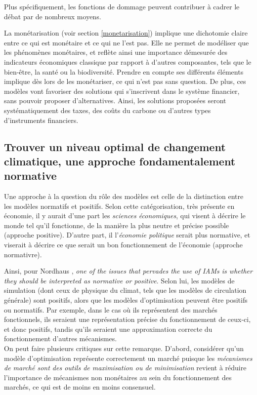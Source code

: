 Plus spécifiquement, les fonctions de dommage peuvent contribuer à cadrer le débat par de nombreux moyens. 

La monétarisation (voir section \ref{monetarisation}) implique une dichotomie claire entre ce qui est monétaire et ce qui ne l'est pas. Elle ne permet de modéliser que les phénomènes monétaires, et reflète ainsi une importance démesurée des indicateurs économiques classique par rapport à d'autres composantes, tels que le bien-être, la santé ou la biodiversité. Prendre en compte ses différents éléments implique dès lors de les monétariser, ce qui n'est pas sans question. 
De plus, ces modèles vont favoriser des solutions qui s'inscrivent dans le système financier, sans pouvoir proposer d'alternatives. Ainsi, les solutions proposées seront systématiquement des taxes, des coûts du carbone ou d'autres types d'instruments financiers.

\subsection{Trouver un niveau optimal de changement climatique, une approche fondamentalement normative}

Une approche à la question du rôle des modèles est celle de la distinction entre les modèles normatifs et positifs. Selon cette catégorisation, très présente en économie, il y aurait d'une part les \emph{sciences économiques}, qui visent à décrire le monde tel qu'il fonctionne, de la manière la plus neutre et précise possible (approche positive). D'autre part, il l'\emph{économie politique} serait plus normative, et viserait à décrire ce que serait un bon fonctionnement de l'économie (approche normativre). 

Ainsi, pour Nordhaus \cite{nordhaus_dice_2013}, \emph{one of the issues that pervades the use of IAMs is whether they should be interpreted as normative or positive}. Selon lui, les modèles de simulation (dont ceux de physique du climat, tels que les modèles de circulation générale) sont positifs, alors que les modèles d'optimisation peuvent être positifs ou normatifs. Par exemple, dans le cas où ils représentent des marchés fonctionnels, ils seraient une représentation précise du fonctionnement de ceux-ci, et donc positifs, tandis qu'ils seraient une approximation correcte du fonctionnement d'autres mécanismes. \\

On peut faire plusieurs critiques sur cette remarque. D'abord, considérer qu'un modèle d'optimisation représente correctement un marché puisque les \emph{mécanismes de marché sont des outils de maximisation ou de minimisation} revient à réduire l'importance de mécanismes non monétaires au sein du fonctionnement des marchés, ce qui est de moins en moins consensuel. 

